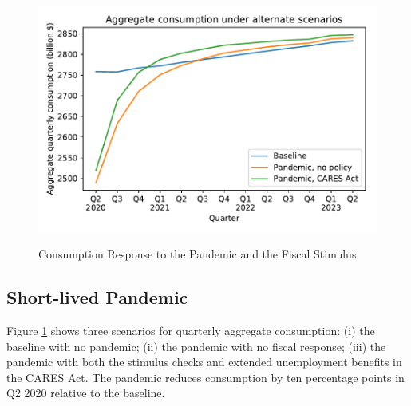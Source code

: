 \documentclass[titlepage]{\econtex}
\begin{document}
\begin{figure}
  \centering
  \caption{Consumption Response to the Pandemic and the Fiscal Stimulus}
  \label{cons_response}
  { \includegraphics[width=8in]{./Figures/AggConResp_examples}}
\end{figure}

\subsection{Short-lived Pandemic}

Figure \ref{cons_response} shows three scenarios for quarterly aggregate consumption: (i) the baseline with no pandemic; (ii) the pandemic with no fiscal response; (iii) the pandemic with both the stimulus checks and extended unemployment benefits in the CARES Act.
The pandemic reduces consumption by ten percentage points in Q2 2020 relative to the baseline.
\end{document}
